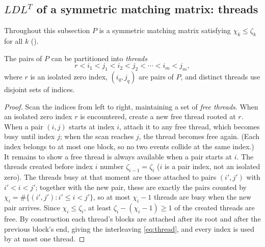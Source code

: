 \subsection{$LDL^T$ of a symmetric matching matrix: threads}

Throughout this subsection $P$ is a symmetric matching matrix satisfying
$\chi_k \le \zeta_k$ for all $k$ ().

\begin{lemma}\label{lem:threads}
  The pairs of $P$ can be partitioned into \emph{threads}
  \begin{equation}\label{eq:thread}
    r < i_1 < j_1 < i_2 < j_2 < \cdots < i_m < j_m,
  \end{equation}
  where $r$ is an isolated zero index, $(i_q, j_q)$ are pairs of $P$, and
  distinct threads use disjoint sets of indices.
\end{lemma}

\begin{proof}
  Scan the indices from left to right, maintaining a set of \emph{free
  threads}.  When an isolated zero index $r$ is encountered, create a new
  free thread rooted at $r$.  When a pair $(i,j)$ starts at index $i$,
  attach it to any free thread, which becomes busy until index $j$; when
  the scan reaches $j$, the thread becomes free again.  (Each index belongs
  to at most one block, so no two events collide at the same index.)  It
  remains to show a free thread is always available when a pair starts at
  $i$.  The threads created before index $i$ number $\zeta_{i-1} = \zeta_i$
  ($i$ is a pair index, not an isolated zero).  The threads busy at that
  moment are those attached to pairs $(i', j')$ with $i' < i < j'$;
  together with the new pair, these are exactly the pairs counted by
  $\chi_i = \#\{(i', j') : i' \le i < j'\}$, so at most $\chi_i - 1$
  threads are busy when the new pair arrives.  Since $\chi_i \le \zeta_i$,
  at least $\zeta_i - (\chi_i - 1) \ge 1$ of the created threads are
  free.  By construction
  each thread's blocks are attached after its root and after the previous
  block's end, giving the interleaving \cref{eq:thread}, and every index is
  used by at most one thread.
\end{proof}

